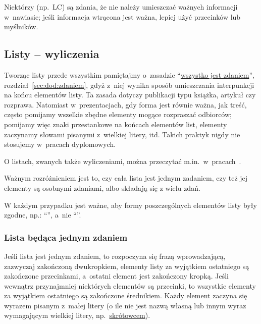 Niektórzy (np.\ LC) są zdania, że nie należy umieszczać ważnych informacji w~nawiasie; jeśli informacja wtrącona jest ważna, lepiej użyć przecinków lub myślników.


\subsection{Listy -- wyliczenia}
\label{sec:dod:listy}

Tworząc listy przede wszystkim pamiętajmy o~zasadzie ``\hyperref[sec:dod:zdaniem]{wszystko jest zdaniem}'', rozdział~\ref{sec:dod:zdaniem}, gdyż z~niej wynika sposób umieszczania interpunkcji na końcu elementów listy. Ta zasada dotyczy publikacji typu książka, artykuł czy rozprawa. Natomiast w~prezentacjach, gdy forma jest równie ważna, jak treść, często pomijamy wszelkie zbędne elementy mogące rozpraszać odbiorców; pomijamy więc znaki przestankowe na końcach elementów list, elementy zaczynamy słowami pisanymi z~wielkiej litery, itd. Takich praktyk nigdy nie stosujemy w~pracach dyplomowych.

O listach, zwanych także wyliczeniami, można przeczytać m.in.\ w~pracach~.

Ważnym rozróżnieniem jest to, czy cała lista jest jednym zadaniem, czy też jej elementy są osobnymi zdaniami, albo składają się z wielu zdań.

W każdym przypadku jest ważne, aby formy poszczególnych elementów listy były zgodne, np.: ``'', a~nie ``''.


\subsubsection{Lista będąca jednym zdaniem}
\label{sec:dod:lista-jedno-zdanie}

Jeśli lista jest jednym zdaniem, to rozpoczyna się frazą wprowadzającą, zazwyczaj zakończoną dwukropkiem, elementy listy za wyjątkiem ostatniego są zakończone przecinkami, a~ostatni element jest zakończony kropką. Jeśli wewnątrz przynajmniej niektórych elementów są przecinki, to wszystkie elementy za wyjątkiem ostatniego są zakończone średnikiem. Każdy element zaczyna się wyrazem pisanym z~małej litery (o ile nie jest nazwą własną lub innym wyraz wymagającym wielkiej litery, np.\ \hyperref[sec:dod:skroty]{skrótowcem}).

